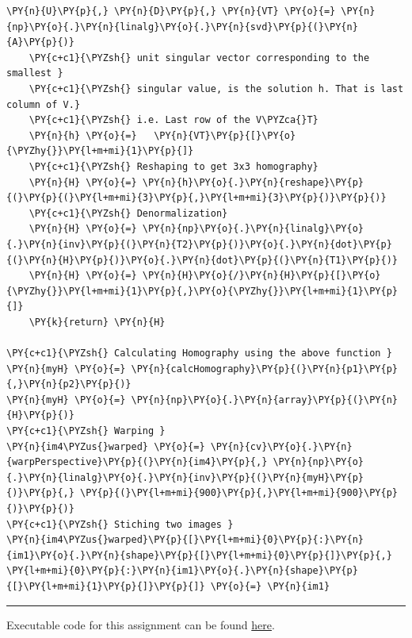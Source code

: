 \documentclass[a4paper,11pt]{article}%
\begin{document}
\begin{tcolorbox}[breakable, size=fbox, boxrule=1pt, pad at break*=1mm,colback=cellbackground, colframe=cellborder]
\begin{Verbatim}[commandchars=\\\{\}]
    \PY{n}{U}\PY{p}{,} \PY{n}{D}\PY{p}{,} \PY{n}{VT} \PY{o}{=} \PY{n}{np}\PY{o}{.}\PY{n}{linalg}\PY{o}{.}\PY{n}{svd}\PY{p}{(}\PY{n}{A}\PY{p}{)}
    \PY{c+c1}{\PYZsh{} unit singular vector corresponding to the smallest }
    \PY{c+c1}{\PYZsh{} singular value, is the solution h. That is last column of V.}
    \PY{c+c1}{\PYZsh{} i.e. Last row of the V\PYZca{}T}
    \PY{n}{h} \PY{o}{=}   \PY{n}{VT}\PY{p}{[}\PY{o}{\PYZhy{}}\PY{l+m+mi}{1}\PY{p}{]}
    \PY{c+c1}{\PYZsh{} Reshaping to get 3x3 homography}
    \PY{n}{H} \PY{o}{=} \PY{n}{h}\PY{o}{.}\PY{n}{reshape}\PY{p}{(}\PY{p}{(}\PY{l+m+mi}{3}\PY{p}{,}\PY{l+m+mi}{3}\PY{p}{)}\PY{p}{)}
    \PY{c+c1}{\PYZsh{} Denormalization}
    \PY{n}{H} \PY{o}{=} \PY{n}{np}\PY{o}{.}\PY{n}{linalg}\PY{o}{.}\PY{n}{inv}\PY{p}{(}\PY{n}{T2}\PY{p}{)}\PY{o}{.}\PY{n}{dot}\PY{p}{(}\PY{n}{H}\PY{p}{)}\PY{o}{.}\PY{n}{dot}\PY{p}{(}\PY{n}{T1}\PY{p}{)}
    \PY{n}{H} \PY{o}{=} \PY{n}{H}\PY{o}{/}\PY{n}{H}\PY{p}{[}\PY{o}{\PYZhy{}}\PY{l+m+mi}{1}\PY{p}{,}\PY{o}{\PYZhy{}}\PY{l+m+mi}{1}\PY{p}{]}
    \PY{k}{return} \PY{n}{H}
    
\PY{c+c1}{\PYZsh{} Calculating Homography using the above function }    
\PY{n}{myH} \PY{o}{=} \PY{n}{calcHomography}\PY{p}{(}\PY{n}{p1}\PY{p}{,}\PY{n}{p2}\PY{p}{)}
\PY{n}{myH} \PY{o}{=} \PY{n}{np}\PY{o}{.}\PY{n}{array}\PY{p}{(}\PY{n}{H}\PY{p}{)}
\PY{c+c1}{\PYZsh{} Warping } 
\PY{n}{im4\PYZus{}warped} \PY{o}{=} \PY{n}{cv}\PY{o}{.}\PY{n}{warpPerspective}\PY{p}{(}\PY{n}{im4}\PY{p}{,} \PY{n}{np}\PY{o}{.}\PY{n}{linalg}\PY{o}{.}\PY{n}{inv}\PY{p}{(}\PY{n}{myH}\PY{p}{)}\PY{p}{,} \PY{p}{(}\PY{l+m+mi}{900}\PY{p}{,}\PY{l+m+mi}{900}\PY{p}{)}\PY{p}{)}
\PY{c+c1}{\PYZsh{} Stiching two images } 
\PY{n}{im4\PYZus{}warped}\PY{p}{[}\PY{l+m+mi}{0}\PY{p}{:}\PY{n}{im1}\PY{o}{.}\PY{n}{shape}\PY{p}{[}\PY{l+m+mi}{0}\PY{p}{]}\PY{p}{,} \PY{l+m+mi}{0}\PY{p}{:}\PY{n}{im1}\PY{o}{.}\PY{n}{shape}\PY{p}{[}\PY{l+m+mi}{1}\PY{p}{]}\PY{p}{]} \PY{o}{=} \PY{n}{im1}
\end{Verbatim}
\end{tcolorbox}
\vfill
\hrule
\begin{center}
	Executable code for this assignment can be found  \href{https://github.com/bimalka98/Computer-Vision-and-Image-Processing/blob/main/EN2550Assignments/A2/180631J_a02.ipynb}{here}.
\end{center}
  
\end{document}
